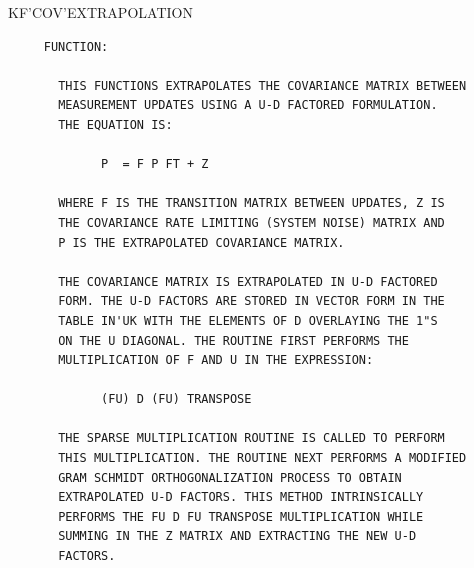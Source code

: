\begin{frame}
KF'COV'EXTRAPOLATION
\begin{verbatim}
     FUNCTION:

       THIS FUNCTIONS EXTRAPOLATES THE COVARIANCE MATRIX BETWEEN
       MEASUREMENT UPDATES USING A U-D FACTORED FORMULATION.
       THE EQUATION IS:

             P  = F P FT + Z

       WHERE F IS THE TRANSITION MATRIX BETWEEN UPDATES, Z IS
       THE COVARIANCE RATE LIMITING (SYSTEM NOISE) MATRIX AND
       P IS THE EXTRAPOLATED COVARIANCE MATRIX.

       THE COVARIANCE MATRIX IS EXTRAPOLATED IN U-D FACTORED
       FORM. THE U-D FACTORS ARE STORED IN VECTOR FORM IN THE
       TABLE IN'UK WITH THE ELEMENTS OF D OVERLAYING THE 1"S
       ON THE U DIAGONAL. THE ROUTINE FIRST PERFORMS THE
       MULTIPLICATION OF F AND U IN THE EXPRESSION:

             (FU) D (FU) TRANSPOSE

       THE SPARSE MULTIPLICATION ROUTINE IS CALLED TO PERFORM
       THIS MULTIPLICATION. THE ROUTINE NEXT PERFORMS A MODIFIED
       GRAM SCHMIDT ORTHOGONALIZATION PROCESS TO OBTAIN
       EXTRAPOLATED U-D FACTORS. THIS METHOD INTRINSICALLY
       PERFORMS THE FU D FU TRANSPOSE MULTIPLICATION WHILE
       SUMMING IN THE Z MATRIX AND EXTRACTING THE NEW U-D
       FACTORS.



\end{verbatim}
\end{frame}
